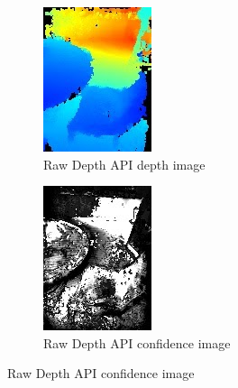\begin{figure}[ht!]
    \begin{subfigure}[b]{0.4\textwidth}
        \centering
        \includegraphics[width=0.8\linewidth]{images/depth_raw-depth-image}
        \caption{Raw Depth API depth image}
    \end{subfigure}%
    \begin{subfigure}[b]{0.4\textwidth}
        \centering
        \includegraphics[width=0.8\linewidth]{images/depth_raw-depth-confidence-image}
        \caption{Raw Depth API confidence image}
    \end{subfigure}%


\end{figure}
